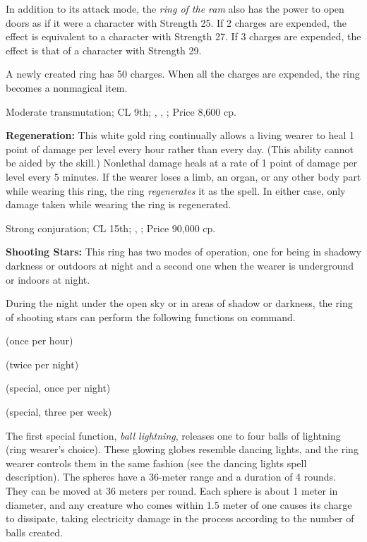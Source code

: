 In addition to its attack mode, the \emph{ring of the ram} also has the power to open doors as if it were a character with Strength 25. If 2 charges are expended, the effect is equivalent to a character with Strength 27. If 3 charges are expended, the effect is that of a character with Strength 29.

A newly created ring has 50 charges. When all the charges are expended, the ring becomes a nonmagical item.

Moderate transmutation; CL 9th; , , ; Price 8,600 cp.

\textbf{Regeneration:} This white gold ring continually allows a living wearer to heal 1 point of damage per level every hour rather than every day. (This ability cannot be aided by the  skill.) Nonlethal damage heals at a rate of 1 point of damage per level every 5 minutes. If the wearer loses a limb, an organ, or any other body part while wearing this ring, the ring \emph{regenerates} it as the spell. In either case, only damage taken while wearing the ring is regenerated.

Strong conjuration; CL 15th; , ; Price 90,000 cp.

\textbf{Shooting Stars:} This ring has two modes of operation, one for being in shadowy darkness or outdoors at night and a second one when the wearer is underground or indoors at night.

During the night under the open sky or in areas of shadow or darkness, the ring of shooting stars can perform the following functions on command.

\begin{itemize*}
\item {} (once per hour)
\item {} (twice per night)
\item {} (special, once per night)
\item {} (special, three per week)
\end{itemize*}

The first special function, \emph{ball lightning}, releases one to four balls of lightning (ring wearer's choice). These glowing globes resemble dancing lights, and the ring wearer controls them in the same fashion (see the dancing lights spell description). The spheres have a 36-meter range and a duration of 4 rounds. They can be moved at 36 meters per round. Each sphere is about 1 meter in diameter, and any creature who comes within 1.5 meter of one causes its charge to dissipate, taking electricity damage in the process according to the number of balls created.

